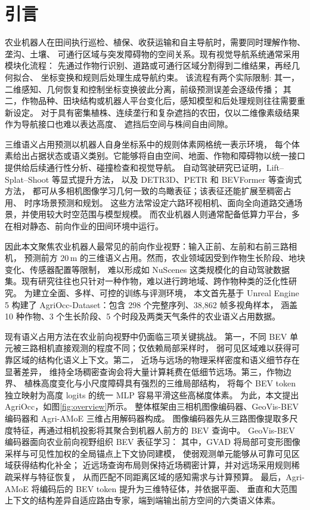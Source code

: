 \section{引言}\label{sec:intro}

农业机器人在田间执行巡检、植保、收获运输和自主导航时，需要同时理解作物、垄沟、土壤、
可通行区域与突发障碍物的空间关系。现有视觉导航系统通常采用模块化流程：
先通过作物行识别、道路或可通行区域分割得到二维结果，再经几何拟合、
坐标变换和规则后处理生成导航约束\cite{nkwochaComprehensiveReviewSensing2025,baiVisionbasedNavigationGuidance2023}。
该流程有两个实际限制:
其一，二维感知、几何恢复和控制坐标变换彼此分离，前级预测误差会逐级传播；
其二，作物品种、田块结构或机器人平台变化后，感知模型和后处理规则往往需要重新设定。
对于具有密集植株、连续垄行和复杂遮挡的农田，仅以二维像素级结果作为导航接口也难以表达高度、
遮挡后空间与株间自由间隙。

三维语义占用预测以机器人自身坐标系中的规则体素网格统一表示环境，
每个体素给出占据状态或语义类别。它能够将自由空间、地面、作物和障碍物以统一接口
提供给后续通行性分析、碰撞检查和视觉导航。
自动驾驶研究已证明，Lift--Splat--Shoot 等显式提升方法\cite{philion2020lift,huang2021bevdet,li2022bevdepth}，
以及 DETR3D、PETR 和 BEVFormer 等查询式方法\cite{wang2022detr3d,li2022petr,li2022bevformer}，
都可从多相机图像学习几何一致的鸟瞰表征；该表征还能扩展至稠密占用\cite{wei2023surroundocc,wang2023openoccupancy}、
时序场景预测和规划\cite{zheng2024occworld,mei2025irwm}。
这些方法常设定六路环视相机、面向全向道路交通场景，并使用较大时空范围与模型规模。
而农业机器人则通常配备低算力平台，多在相对静态、前向作业的田间环境中运行。

因此本文聚焦农业机器人最常见的前向作业视野：输入正前、左前和右前三路相机，
预测前方 $20\,$m 的三维语义占用。然而，农业领域因受到作物生长阶段、地块变化、传感器配置等限制，
难以形成如 NuScenes 这类规模化的自动驾驶数据集。现有研究往往也只针对一种作物，难以进行跨地域、跨作物种类的泛化性研究。
为建立全面、多样、可控的训练与评测环境，
本文首先基于 Unreal Engine 5 构建了 AgriOcc-Dataset：包含 298 个完整序列、38,862 帧多视角样本，
涵盖 10 种作物、3 个生长阶段、5 个时段及两类天气条件的农业语义占用数据。

现有语义占用方法在农业前向视野中仍面临三项关键挑战。
第一，不同 BEV 单元被三路相机直接观测的程度不同；仅依赖局部采样时，
弱可见区域难以获得可靠区域的结构化语义上下文。第二，
近场与远场的物理采样密度和语义细节存在显著差异，
维持全场稠密查询会将大量计算耗费在低细节远场。第三，作物边界、
植株高度变化与小尺度障碍具有强烈的三维局部结构，
将每个 BEV token 独立映射为高度 logits 的统一 MLP 容易平滑这些高梯度体素。
为此，本文提出 AgriOcc，如图\ref{fig:overview}所示。
整体框架由三相机图像编码器、GeoVis-BEV 编码器和 Agri-AMoE 三维占用解码器构成。
图像编码器先从三路图像提取多尺度特征，再通过相机投影将其聚合到机器人前方的 BEV 查询中。
GeoVis-BEV 编码器面向农业前向视野组织 BEV 表征学习：
其中，GVAD 将局部可变形图像采样与可见性加权的全局锚点上下文协同建模，
使弱观测单元能够从可靠可见区域获得结构化补全；
近远场查询布局则保持近场稠密计算，并对远场采用规则稀疏采样与特征恢复，
从而匹配不同距离区域的感知需求与计算预算。
最后，Agri-AMoE 将编码后的 BEV token 提升为三维特征体，并依据平面、
垂直和大范围上下文的结构差异自适应路由专家，端到端输出前方空间的六类语义体素。


